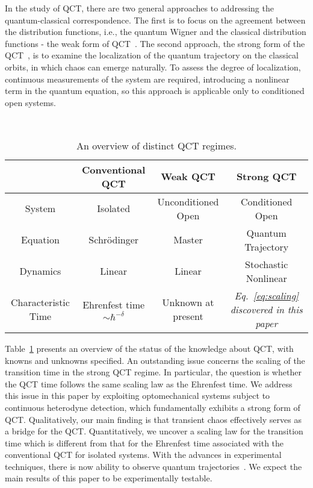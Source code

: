 \documentclass[12pt]{wlscirep}
\begin{document}
In the study of QCT, there are two general approaches to addressing the
quantum-classical correspondence. The first 
is to focus on the agreement between the distribution functions, i.e., 
the quantum Wigner and the classical distribution functions - 
the weak form of QCT~\cite{KLRS:2008,KRSL:2007}. The second approach,
the strong form of the QCT~\cite{BHJ:2000,HJS:2006}, is to examine the 
localization of the quantum trajectory on the classical orbits, in which 
chaos can emerge naturally. To assess the degree of localization,
continuous measurements of the system are required, introducing a 
nonlinear term in the quantum equation, so this approach is applicable
only to conditioned open systems.

\begin{table}[t]
\parbox{15.0cm}{
\caption{\label{tab:1}
An overview of distinct QCT regimes.}} \\
\centering
\begin{tabular}{|c|c|c|c|} \hline
       & Conventional QCT & Weak QCT & Strong QCT \\ \hline
      System & Isolated & Unconditioned Open & Conditioned Open \\ \hline
      Equation & Schr\"{o}dinger & Master & Quantum Trajectory \\ \hline
      Dynamics & Linear & Linear & Stochastic Nonlinear \\ \hline
      Characteristic Time & Ehrenfest time $\sim\hbar^{-\delta}$ &
      Unknown at present  & {\em Eq.~\eqref{eq:scaling}
      discovered in this paper}  \\ \hline
\end{tabular}
\end{table}
   
Table~\ref{tab:1} presents an overview of the status of the knowledge
about QCT, with knowns and unknowns specified. An outstanding issue 
concerns the scaling of the transition time in the strong QCT regime.
In particular, the question is whether the QCT time follows the same scaling 
law as the Ehrenfest time. We address this issue in this paper by exploiting
optomechanical systems subject to continuous heterodyne detection, which
fundamentally exhibits a strong form of QCT. Qualitatively, our main 
finding is that transient chaos effectively serves as a bridge for the 
QCT. Quantitatively, we uncover a scaling law for the transition time
which is different from that for the Ehrenfest time associated with 
the conventional QCT for isolated systems. With the advances in 
experimental techniques, there is now ability to observe quantum 
trajectories~\cite{BAF:2015,CSBSMRH:2016}. We expect the main
results of this paper to be experimentally testable.  
\end{document}
